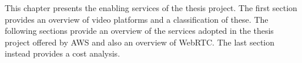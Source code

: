 This chapter presents the enabling services of the thesis project. The first section provides an overview of video platforms and a classification of these. The following sections provide an overview of the services adopted in the thesis project offered by AWS and also an overview of WebRTC. The last section instead provides a cost analysis.
